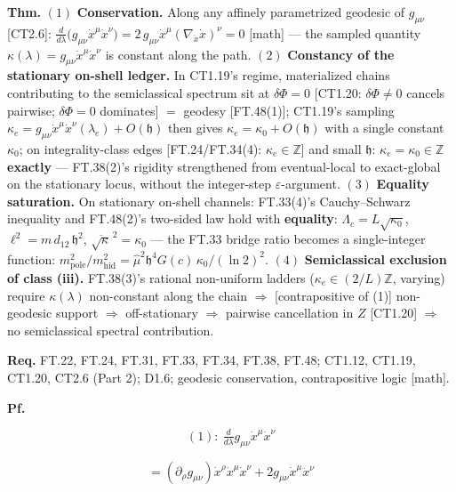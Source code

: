 \begin{theorem}\label{tag:FT-53}
\textbf{Thm.} $(1)$ \textbf{Conservation.} Along any affinely parametrized geodesic of $g_{\mu\nu}$ [CT2.6]: $\frac{d}{d\lambda}\bigl(g_{\mu\nu}\dot x^\mu\dot x^\nu\bigr)=2\,g_{\mu\nu}\dot x^\mu(\nabla_{\dot x}\dot x)^\nu=0$ [math] — the sampled quantity $\kappa(\lambda)=g_{\mu\nu}\dot x^\mu\dot x^\nu$ is constant along the path. $(2)$ \textbf{Constancy of the stationary on-shell ledger.} In CT1.19's regime, materialized chains contributing to the semiclassical spectrum sit at $\delta\Phi=0$ [CT1.20: $\delta\Phi\ne0$ cancels pairwise; $\delta\Phi=0$ dominates] $=$ geodesy [FT.48(1)]; CT1.19's sampling $\kappa_e=g_{\mu\nu}\dot x^\mu\dot x^\nu(\lambda_e)+O(\mathfrak h)$ then gives $\kappa_e=\kappa_0+O(\mathfrak h)$ with a single constant $\kappa_0$; on integrality-class edges [FT.24/FT.34(4): $\kappa_e\in\mathbb Z$] and small $\mathfrak h$: $\kappa_e=\kappa_0\in\mathbb Z$ \textbf{exactly} — FT.38(2)'s rigidity strengthened from eventual-local to exact-global on the stationary locus, without the integer-step $\varepsilon$-argument. $(3)$ \textbf{Equality saturation.} On stationary on-shell channels: FT.33(4)'s Cauchy–Schwarz inequality and FT.48(2)'s two-sided law hold with \textbf{equality}: $\Lambda_c=L\sqrt{\kappa_0}$, $\ell^2=m\,d_{12}\,\mathfrak h^2$, $\overline{\sqrt\kappa}^{\,2}=\kappa_0$ — the FT.33 bridge ratio becomes a single-integer function: $m_{\mathrm{pole}}^2/m_{\mathrm{hid}}^2=\hat\mu^2\mathfrak h^4G(c)\,\kappa_0/(\ln2)^2$. $(4)$ \textbf{Semiclassical exclusion of class (iii).} FT.38(3)'s rational non-uniform ladders ($\kappa_e\in(2/L)\mathbb Z$, varying) require $\kappa(\lambda)$ non-constant along the chain $\Rightarrow$ [contrapositive of (1)] non-geodesic support $\Rightarrow$ off-stationary $\Rightarrow$ pairwise cancellation in $Z$ [CT1.20] $\Rightarrow$ no semiclassical spectral contribution.

\textbf{Req.} FT.22, FT.24, FT.31, FT.33, FT.34, FT.38, FT.48; CT1.12, CT1.19, CT1.20, CT2.6 (Part 2); D1.6; geodesic conservation, contrapositive logic [math].

\textbf{Pf.}

\[
(1):\ \tfrac{d}{d\lambda}g_{\mu\nu}\dot x^\mu\dot x^\nu
\]

\[
= (\partial_\rho g_{\mu\nu})\dot x^\rho\dot x^\mu\dot x^\nu+2g_{\mu\nu}\dot x^\mu\ddot x^\nu
\]


\end{theorem}
